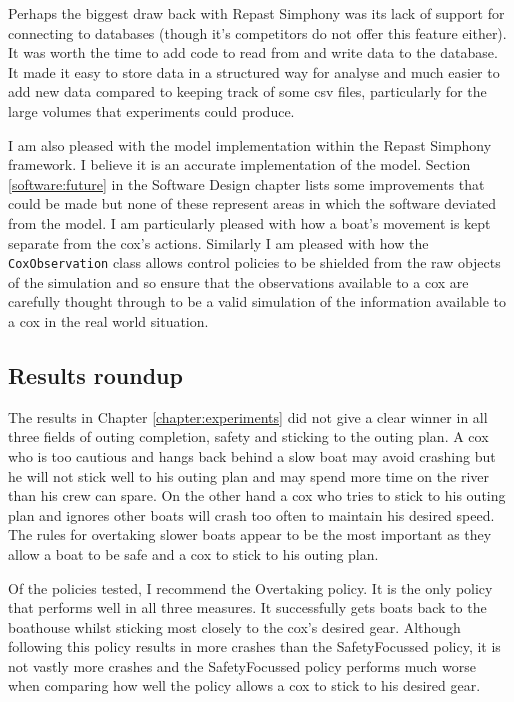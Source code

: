   Perhaps the biggest draw back with Repast Simphony was its lack of support for connecting to databases (though it's competitors do not offer this feature either). It was worth the time to add code to read from and write data to the database. It made it easy to store data in a structured way for analyse and much easier to add new data compared to keeping track of some csv files, particularly for the large volumes that experiments could produce. 
  
  I am also pleased with the model implementation within the Repast Simphony framework. I believe it is an accurate implementation of the model. Section \ref{software:future} in the Software Design chapter lists some improvements that could be made but none of these represent areas in which the software deviated from the model. I am particularly pleased with how a boat's movement is kept separate from the cox's actions. Similarly I am pleased with how the \texttt{CoxObservation} class allows control policies to be shielded from the raw objects of the simulation and so ensure that the observations available to a cox are carefully thought through to be a valid simulation of the information available to a cox in the real world situation.
  
  \subsection{Results roundup}
  The results in Chapter \ref{chapter:experiments} did not give a clear winner in all three fields of outing completion, safety and sticking to the outing plan. A cox who is too cautious and hangs back behind a slow boat may avoid crashing but he will not stick well to his outing plan and may spend more time on the river than his crew can spare. On the other hand a cox who tries to stick to his outing plan and ignores other boats will crash too often to maintain his desired speed. The rules for overtaking slower boats appear to be the most important as they allow a boat to be safe and a cox to stick to his outing plan. 
  
  Of the policies tested, I recommend the Overtaking policy. It is the only policy that performs well in all three measures. It successfully gets boats back to the boathouse whilst sticking most closely to the cox's desired gear. Although following this policy results in more crashes than the SafetyFocussed policy, it is not vastly more crashes and the SafetyFocussed policy performs much worse when comparing how well the policy allows a cox to stick to his desired gear.
  
